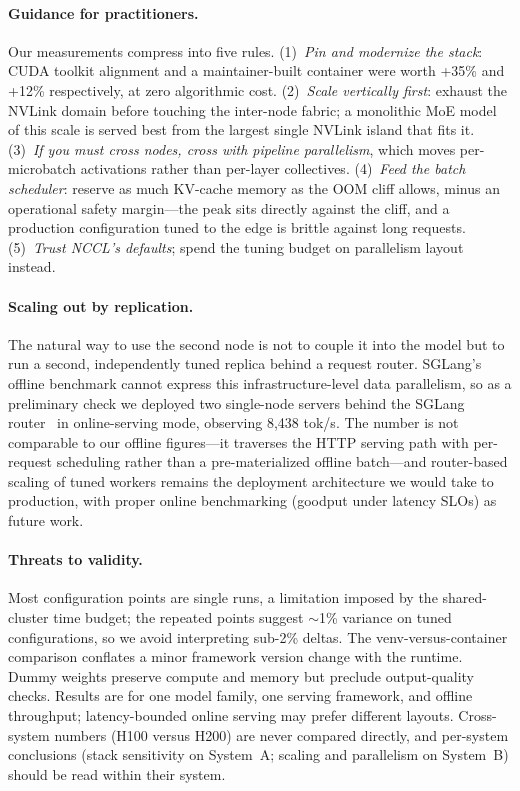 \documentclass[sigconf]{acmart}
\begin{document}
\paragraph{Guidance for practitioners.}
Our measurements compress into five rules. (1)~\emph{Pin and modernize the stack}: CUDA toolkit alignment and a maintainer-built container were worth +35\% and +12\% respectively, at zero algorithmic cost. (2)~\emph{Scale vertically first}: exhaust the NVLink domain before touching the inter-node fabric; a monolithic MoE model of this scale is served best from the largest single NVLink island that fits it. (3)~\emph{If you must cross nodes, cross with pipeline parallelism}, which moves per-microbatch activations rather than per-layer collectives. (4)~\emph{Feed the batch scheduler}: reserve as much KV-cache memory as the OOM cliff allows, minus an operational safety margin---the peak sits directly against the cliff, and a production configuration tuned to the edge is brittle against long requests. (5)~\emph{Trust NCCL's defaults}; spend the tuning budget on parallelism layout instead.

\paragraph{Scaling out by replication.}
The natural way to use the second node is not to couple it into the model but to run a second, independently tuned replica behind a request router. SGLang's offline benchmark cannot express this infrastructure-level data parallelism, so as a preliminary check we deployed two single-node servers behind the SGLang router~\cite{sglangrouter} in online-serving mode, observing 8{,}438 tok/s. The number is not comparable to our offline figures---it traverses the HTTP serving path with per-request scheduling rather than a pre-materialized offline batch---and router-based scaling of tuned workers remains the deployment architecture we would take to production, with proper online benchmarking (goodput under latency SLOs) as future work.

\paragraph{Threats to validity.}
Most configuration points are single runs, a limitation imposed by the shared-cluster time budget; the repeated points suggest $\sim$1\% variance on tuned configurations, so we avoid interpreting sub-2\% deltas. The venv-versus-container comparison conflates a minor framework version change with the runtime. Dummy weights preserve compute and memory but preclude output-quality checks. Results are for one model family, one serving framework, and offline throughput; latency-bounded online serving may prefer different layouts. Cross-system numbers (H100 versus H200) are never compared directly, and per-system conclusions (stack sensitivity on System~A; scaling and parallelism on System~B) should be read within their system.
\end{document}
